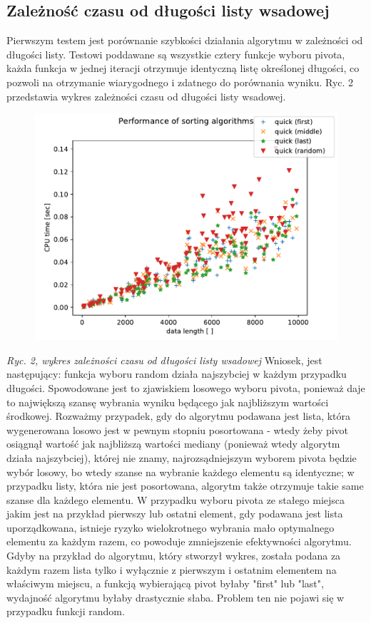 \documentclass[a4paper,11pt]{report}
\begin{document}
\subsection{Zależność czasu od długości listy wsadowej}
Pierwszym testem jest porównanie szybkości działania algorytmu w zależności od długości listy. Testowi poddawane są wszystkie cztery funkcje wyboru pivota, każda funkcja w jednej iteracji otrzymuje identyczną listę określonej długości, co pozwoli na otrzymanie wiarygodnego i zdatnego do porównania wyniku. Ryc. 2 przedstawia wykres zależności czasu od długości listy wsadowej.
\begin{figure}[h!]
\centering
\includegraphics[scale=1]{Figure_1.pdf}
\end{figure}
\textit{Ryc. 2, wykres zależności czasu od długości listy wsadowej}
Wniosek, jest następujący: funkcja wyboru random działa najszybciej w każdym przypadku długości. Spowodowane jest to zjawiskiem losowego wyboru pivota, ponieważ daje to największą szansę wybrania wyniku będącego jak najbliższym wartości środkowej. Rozważmy przypadek, gdy do algorytmu podawana jest lista, która wygenerowana losowo jest w pewnym stopniu posortowana - wtedy żeby pivot osiągnął wartość jak najbliższą wartości mediany (ponieważ wtedy algorytm działa najszybciej), której nie znamy, najrozsądniejszym wyborem pivota będzie wybór losowy, bo wtedy szanse na wybranie każdego elementu są identyczne; w przypadku listy, która nie jest posortowana, algorytm także otrzymuje takie same szanse dla każdego elementu. W przypadku wyboru pivota ze stałego miejsca jakim jest na przykład pierwszy lub ostatni element, gdy podawana jest lista uporządkowana,  istnieje ryzyko wielokrotnego wybrania mało optymalnego elementu za każdym razem, co powoduje zmniejszenie efektywności algorytmu. Gdyby na przykład do algorytmu, który stworzył wykres, została podana za każdym razem lista tylko i wyłącznie z pierwszym i ostatnim elementem na właściwym miejscu, a funkcją wybierającą pivot byłaby "first" lub "last", wydajność algorytmu byłaby drastycznie słaba. Problem ten nie pojawi się w przypadku funkcji random.
\end{document}

